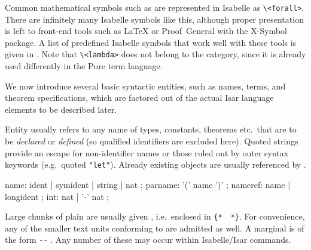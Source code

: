 \begin{isabellebody}
\begin{isamarkuptext}
  Common mathematical symbols such as \isa{{\isasymforall}} are represented in
  Isabelle as \verb|\<forall>|.  There are infinitely many Isabelle
  symbols like this, although proper presentation is left to front-end
  tools such as {\LaTeX} or Proof~General with the X-Symbol package.
  A list of predefined Isabelle symbols that work well with these
  tools is given in .  Note that \verb|\<lambda>|
  does not belong to the  category, since it is already
  used differently in the Pure term language.%
\end{isamarkuptext}%
\isamarkuptrue%
%
\isamarkuptrue%
%
\begin{isamarkuptext}%
We now introduce several basic syntactic entities, such as names,
  terms, and theorem specifications, which are factored out of the
  actual Isar language elements to be described later.%
\end{isamarkuptext}%
\isamarkuptrue%
%
\isamarkuptrue%
%
\begin{isamarkuptext}%
Entity  usually refers to any name of types,
  constants, theorems etc.\ that are to be \emph{declared} or
  \emph{defined} (so qualified identifiers are excluded here).  Quoted
  strings provide an escape for non-identifier names or those ruled
  out by outer syntax keywords (e.g.\ quoted \verb|"let"|).
  Already existing objects are usually referenced by
  .

  \begin{rail}
    name: ident | symident | string | nat
    ;
    parname: '(' name ')'
    ;
    nameref: name | longident
    ;
    int: nat | '-' nat
    ;
  \end{rail}%
\end{isamarkuptext}%
\isamarkuptrue%
%
\isamarkuptrue%
%
\begin{isamarkuptext}%
Large chunks of plain  are usually given
  , i.e.\ enclosed in \verb|{|\verb|*|~\isa{{\isachardoublequote}{\isasymdots}{\isachardoublequote}}~\verb|*|\verb|}|.  For convenience,
  any of the smaller text units conforming to  are
  admitted as well.  A marginal  is of the form
  \verb|--| .  Any number of these may occur
  within Isabelle/Isar commands.


\end{isamarkuptext}
\end{isabellebody}
